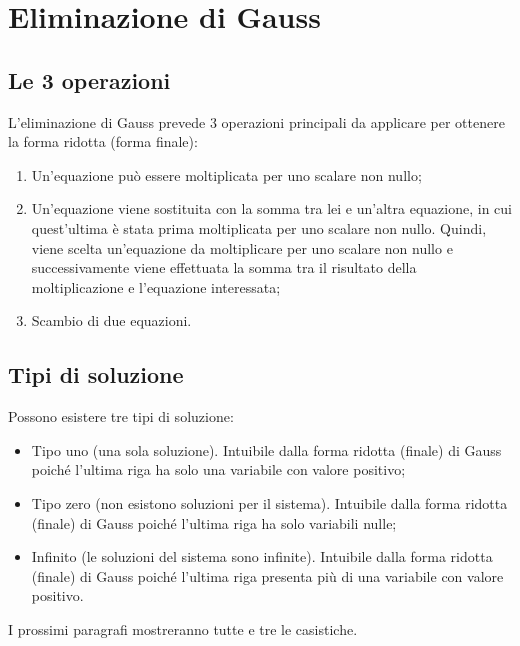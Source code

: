 \documentclass[a4paper]{article}
\begin{document}
	\section{Eliminazione di Gauss}
	
	\subsection{Le 3 operazioni}\label{EG: 3 operazioni}
	
	L'eliminazione di Gauss prevede 3 operazioni principali da applicare per ottenere la forma ridotta (forma finale):
	\begin{enumerate}
		\item Un'equazione può essere moltiplicata per uno scalare non nullo;
		
		\item Un'equazione viene sostituita con la somma tra lei e un'altra equazione, in cui quest'ultima è stata prima moltiplicata per uno scalare non nullo. Quindi, viene scelta un'equazione da moltiplicare per uno scalare non nullo e successivamente viene effettuata la somma tra il risultato della moltiplicazione e l'equazione interessata;
		
		\item Scambio di due equazioni.
	\end{enumerate}

	\subsection{Tipi di soluzione}
	
	Possono esistere tre tipi di soluzione:
	\begin{itemize}
		\item Tipo uno (una sola soluzione). Intuibile dalla forma ridotta (finale) di Gauss poiché l'ultima riga ha solo una variabile con valore positivo;
		
		\item Tipo zero (non esistono soluzioni per il sistema). Intuibile dalla forma ridotta (finale) di Gauss poiché l'ultima riga ha solo variabili nulle;
		
		\item Infinito (le soluzioni del sistema sono infinite). Intuibile dalla forma ridotta (finale) di Gauss poiché l'ultima riga presenta più di una variabile con valore positivo.
	\end{itemize}
	I prossimi paragrafi mostreranno tutte e tre le casistiche.\newpage
\end{document}
